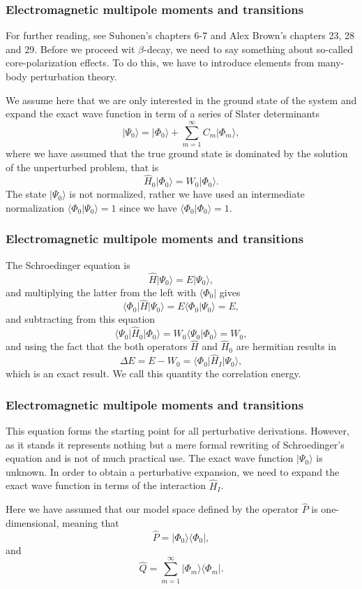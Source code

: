 \documentclass{beamer}
\begin{document}
\begin{frame}
\frametitle{Electromagnetic multipole moments and transitions}

\begin{block}{}
For further reading, see Suhonen's chapters 6-7 and Alex Brown's chapters 23, 28 and 29. 
Before we proceed wit $\beta$-decay, we need to say something about so-called core-polarization effects.
To do this, we have to introduce elements from many-body perturbation theory.

We assume here that we are only interested in the ground state of the system and 
expand the exact wave function in term of a series of Slater determinants
\[
\vert \Psi_0\rangle = \vert \Phi_0\rangle + \sum_{m=1}^{\infty}C_m\vert \Phi_m\rangle,
\]
where we have assumed that the true ground state is dominated by the 
solution of the unperturbed problem, that is
\[
\hat{H}_0\vert \Phi_0\rangle= W_0\vert \Phi_0\rangle.
\]
The state $\vert \Psi_0\rangle$ is not normalized, rather we have used an intermediate 
normalization $\langle \Phi_0 \vert \Psi_0\rangle=1$ since we have $\langle \Phi_0\vert \Phi_0\rangle=1$. 
\end{block}
\end{frame}

\begin{frame}
\frametitle{Electromagnetic multipole moments and transitions}

\begin{block}{}
The Schroedinger equation is
\[
\hat{H}\vert \Psi_0\rangle = E\vert \Psi_0\rangle,
\]
and multiplying the latter from the left with $\langle \Phi_0\vert $ gives
\[
\langle \Phi_0\vert \hat{H}\vert \Psi_0\rangle = E\langle \Phi_0\vert \Psi_0\rangle=E,
\]
and subtracting from this equation
\[
\langle \Psi_0\vert \hat{H}_0\vert \Phi_0\rangle= W_0\langle \Psi_0\vert \Phi_0\rangle=W_0,
\]
and using the fact that the both operators $\hat{H}$ and $\hat{H}_0$ are hermitian 
results in
\[
\Delta E=E-W_0=\langle \Phi_0\vert \hat{H}_I\vert \Psi_0\rangle,
\]
which is an exact result. We call this quantity the correlation energy.
\end{block}
\end{frame}

\begin{frame}
\frametitle{Electromagnetic multipole moments and transitions}

\begin{block}{}
This equation forms the starting point for all perturbative derivations. However,
as it stands it represents nothing but a mere formal rewriting of Schroedinger's equation and is not of much practical use. The exact wave function $\vert \Psi_0\rangle$ is unknown. In order to obtain a perturbative expansion, we need to expand the exact wave function in terms of the interaction $\hat{H}_I$. 

Here we have assumed that our model space defined by the operator $\hat{P}$ is one-dimensional, meaning that
\[
\hat{P}= \vert \Phi_0\rangle \langle \Phi_0\vert ,
\]
and
\[
\hat{Q}=\sum_{m=1}^{\infty}\vert \Phi_m\rangle \langle \Phi_m\vert .
\]
\end{block}
\end{frame}
\end{document}

